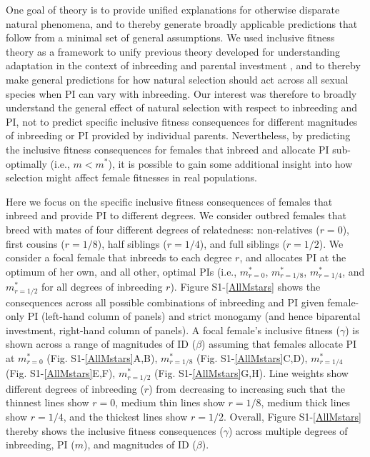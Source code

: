 \documentclass[12pt]{article}
\begin{document}
\noindent One goal of theory is to provide unified explanations for otherwise disparate natural phenomena, and to thereby generate broadly applicable predictions that follow from a minimal set of general assumptions. We used inclusive fitness theory as a framework to unify previous theory developed for understanding adaptation in the context of inbreeding \cite[e.g.,][]{Parker1979, Parker2006} and parental investment \cite[e.g.,][]{Macnair1978, Parker1978}, and to thereby make general predictions for how natural selection should act across all sexual species when PI can vary with inbreeding. Our interest was therefore to broadly understand the general effect of natural selection with respect to inbreeding and PI, not to predict specific inclusive fitness consequences for different magnitudes of inbreeding or PI provided by individual parents. Nevertheless, by predicting the inclusive fitness consequences for females that inbreed and allocate PI sub-optimally (i.e., $m < m^{*}$), it is possible to gain some additional insight into how selection might affect female fitnesses in real populations. 

Here we focus on the specific inclusive fitness consequences of females that inbreed and provide PI to different degrees. We consider outbred females that breed with mates of four different degrees of relatedness: non-relatives ($r=0$), first cousins ($r=1/8$), half siblings ($r=1/4$), and full siblings ($r=1/2$). We consider a focal female that inbreeds to each degree $r$, and allocates PI at the optimum of her own, and all other, optimal PIs (i.e., $m^{*}_{r=0}$, $m^{*}_{r=1/8}$, $m^{*}_{r=1/4}$, and $m^{*}_{r=1/2}$ for all degrees of inbreeding $r$). Figure S1-\ref{AllMstars} shows the consequences across all possible combinations of inbreeding and PI given female-only PI (left-hand column of panels) and strict monogamy (and hence biparental investment, right-hand column of panels). A focal female's inclusive fitness ($\gamma$) is shown across a range of magnitudes of ID ($\beta$) assuming that females allocate PI at $m^{*}_{r=0}$ (Fig. S1-\ref{AllMstars}A,B), $m^{*}_{r=1/8}$ (Fig. S1-\ref{AllMstars}C,D), $m^{*}_{r=1/4}$ (Fig. S1-\ref{AllMstars}E,F), $m^{*}_{r=1/2}$ (Fig. S1-\ref{AllMstars}G,H). Line weights show different degrees of inbreeding ($r$) from decreasing to increasing such that the thinnest lines show $r=0$, medium thin lines show $r=1/8$, medium thick lines show $r=1/4$, and the thickest lines show $r=1/2$. Overall, Figure S1-\ref{AllMstars} thereby shows the inclusive fitness consequences ($\gamma$) across multiple degrees of inbreeding, PI ($m$), and magnitudes of ID ($\beta$).
\end{document}
